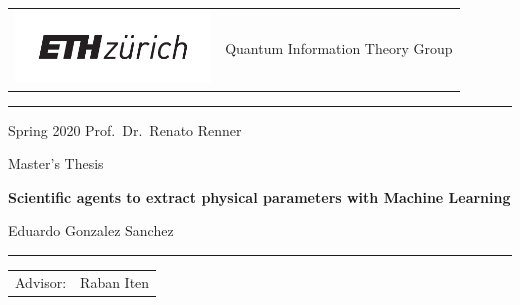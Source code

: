 \documentclass[11pt,a4paper,twoside]{report}
\newcommand{\+}{\textnormal{+} }
\theoremstyle{definition}
\numberwithin{equation}{chapter}
\begin{document}
\begin{titlepage}
  \mbox{}

  \vspace{-1.5cm}
  \noindent
  \begin{tabular}{@{} l @{} l @{}}
    \begin{minipage}[c]{0.5\textwidth}
      \hspace{-4mm}
      \includegraphics[height=19mm]{figures/eth_logo.pdf}
    \end{minipage} &
    \begin{minipage}[c]{0.5\textwidth}
       \hfill \large Quantum Information Theory Group
    \end{minipage} \\
  \end{tabular}
  \rule{\textwidth}{0.5pt}
  \begin{center}
    {\Large 
      Spring 2020 \hfill Prof.~Dr.~Renato Renner
    }
    
    \LARGE
    Master's Thesis
 
    \Huge\textbf{Scientific agents to extract physical
    parameters with Machine Learning}
    
    \LARGE{
      Eduardo Gonzalez Sanchez
    }
    
    \rule{\textwidth}{0.5pt}
   
    \vspace{0.0cm}
    \begin{flushleft}
      \begin{tabular}{ll}
        \Large Advisor: & \Large 
        Raban Iten
      \end{tabular}
    \end{flushleft}
  \end{center}
\end{titlepage}
%

\thispagestyle{plain}
\cleardoublepage
\end{document}
